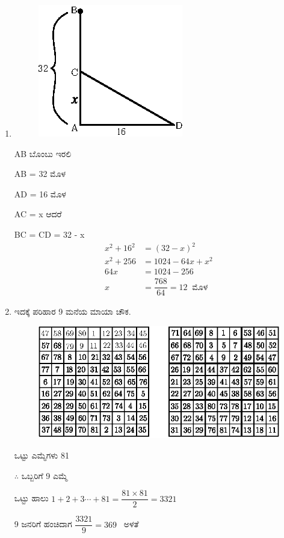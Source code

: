\begin{enumerate}
\item
\begin{figure}[!h]
\centering
\includegraphics{images/chap5/ans22.eps}
\end{figure}

AB ಬೊಂಬು ಇರಲಿ 

AB = 32 ಮೊಳ 

AD = 16 ಮೊಳ 

AC = x ಆದರೆ

BC = CD = 32 - x
\begin{align*}
x^{2} + 16^{2} & = (32 - x)^{2}\\
x^{2} + 256 & = 1024 - 64x + x^{2}\\
64x & = 1024 - 256\\
x & = \dfrac{768}{64} = 12~\text{ ಮೊಳ}
\end{align*}

\item ಇದಕ್ಕೆ ಪರಿಹಾರ 9 ಮನೆಯ ಮಾಯಾ ಚೌಕ.
\begin{figure}[!h]
\centering
\includegraphics{images/chap5/ans23.eps}
\end{figure}

ಒಟ್ಟು ಎಮ್ಮೆಗಳು 81 

$\therefore$ ಒಬ್ಬರಿಗೆ 9 ಎಮ್ಮೆ 

ಒಟ್ಟು ಹಾಲು $1+2+3\cdots + 81 = \dfrac{81 \times 81}{2} = 3321$

9 ಜನರಿಗೆ ಹಂಚಿದಾಗ $\dfrac{3321}{9} = 369$~ ಅಳತೆ 


\end{enumerate}
